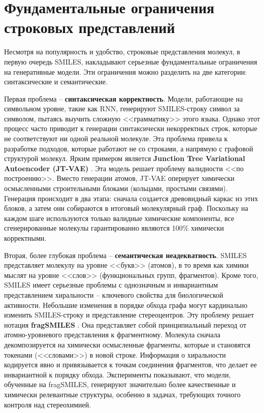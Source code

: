 
\section{Фундаментальные ограничения строковых представлений}
\label{sec:string_limitations}

Несмотря на популярность и удобство, строковые представления молекул, в первую очередь SMILES, накладывают серьезные фундаментальные ограничения на генеративные модели. Эти ограничения можно разделить на две категории: синтаксические и семантические.

Первая проблема -- \textbf{синтаксическая корректность}. Модели, работающие на символьном уровне, такие как RNN, генерируют SMILES-строку символ за символом, пытаясь выучить сложную <<грамматику>> этого языка. Однако этот процесс часто приводит к генерации синтаксически некорректных строк, которые не соответствуют ни одной реальной молекуле. Эта проблема привела к разработке подходов, которые работают не со строками, а напрямую с графовой структурой молекул. Ярким примером является \textbf{Junction Tree Variational Autoencoder (JT-VAE)} \cite{jin2018junction}. Эта модель решает проблему валидности <<по построению>>. Вместо генерации атомов, JT-VAE оперирует химически осмысленными строительными блоками (кольцами, простыми связями). Генерация происходит в два этапа: сначала создается древовидный каркас из этих блоков, а затем они собираются в итоговый молекулярный граф. Поскольку на каждом шаге используются только валидные химические компоненты, все сгенерированные молекулы гарантированно являются 100\% химически корректными.

Вторая, более глубокая проблема -- \textbf{семантическая неадекватность}. SMILES представляет молекулу на уровне <<букв>> (атомов), в то время как химики мыслят на уровне <<слов>> (функциональных групп, фрагментов). Кроме того, SMILES имеет серьезные проблемы с однозначным и инвариантным представлением хиральности -- ключевого свойства для биологической активности. Небольшие изменения в порядке обхода графа могут кардинально изменить SMILES-строку и представление стереоцентров. Эту проблему решает нотация \textbf{fragSMILES} \cite{mastrolorito2025fragsmiles}. Она представляет собой принципиальный переход от атомно-уровневого представления к фрагментному. Молекула сначала декомпозируется на химически осмысленные фрагменты, которые и становятся токенами (<<словами>>) в новой строке. Информация о хиральности кодируется явно и привязывается к точкам соединения фрагментов, что делает ее инвариантной к порядку обхода. Эксперименты показывают, что модели, обученные на fragSMILES, генерируют значительно более качественные и химически релевантные структуры, особенно в задачах, требующих точного контроля над стереохимией.
